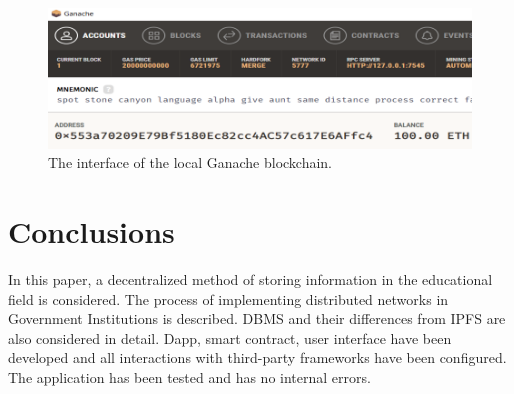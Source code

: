 \documentclass[10pt,conference,a4paper]{IEEEtran_EDM}
\begin{document}
\begin{figure}[htbp]
\centerline{\includegraphics[scale=0.51]{fig3.png}}
\caption{The interface of the local Ganache blockchain.}
\label{GanacheB}
\end{figure}

\section{Conclusions }
In this paper, a decentralized method of storing information in the educational field is considered. The process of implementing distributed networks in Government Institutions is described. DBMS and their differences from IPFS are also considered in detail. Dapp, smart contract, user interface have been developed and all interactions with third-party frameworks have been configured. The application has been tested and has no internal errors.
\end{document}

